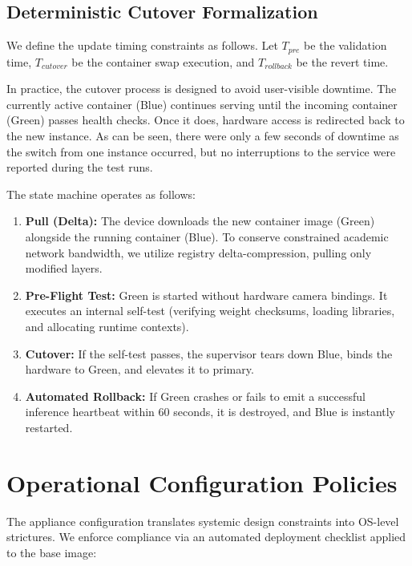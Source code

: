 \documentclass[conference]{IEEEtran}
\begin{document}
\subsection{Deterministic Cutover Formalization}
We define the update timing constraints as follows. Let $T_{pre}$ be the validation time, $T_{cutover}$ be the container swap execution, and $T_{rollback}$ be the revert time. 

In practice, the cutover process is designed to avoid user-visible downtime. The currently active container (Blue) continues serving until the incoming container (Green) passes health checks. Once it does, hardware access is redirected back to the new instance. As can be seen, there were only a few seconds of downtime as the switch from one instance occurred, but no interruptions to the service were reported during the test runs.

The state machine operates as follows:
\begin{enumerate}
\item \textbf{Pull (Delta):} The device downloads the new container image (Green) alongside the running container (Blue). To conserve constrained academic network bandwidth, we utilize registry delta-compression, pulling only modified layers.
\item \textbf{Pre-Flight Test:} Green is started without hardware camera bindings. It executes an internal self-test (verifying weight checksums, loading libraries, and allocating runtime contexts).
\item \textbf{Cutover:} If the self-test passes, the supervisor tears down Blue, binds the hardware to Green, and elevates it to primary.
\item \textbf{Automated Rollback:} If Green crashes or fails to emit a successful inference heartbeat within 60 seconds, it is destroyed, and Blue is instantly restarted.
\end{enumerate}

\section{Operational Configuration Policies}

The appliance configuration translates systemic design constraints into OS-level strictures. We enforce compliance via an automated deployment checklist applied to the base image:
\end{document}
